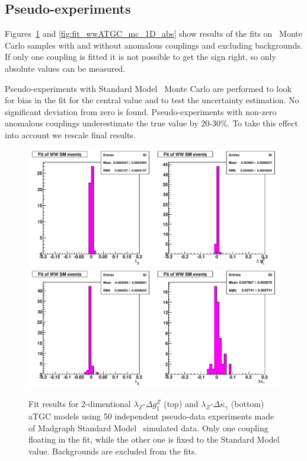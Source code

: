 \subsection{Pseudo-experiments}
Figures~\ref{fig:fit_ww_mc_1D} and \ref{fig:fit_wwATGC_mc_1D_abs} show
results of the fits on \ww\ Monte Carlo samples with and without
anomalous couplings and excluding backgrounds. If only one coupling is
fitted it is not possible to get the sign right, so only absolute
values can be measured.

Pseudo-experiments with Standard Model \ww\ Monte Carlo are performed to look
for bias in the fit for the central value and to test the uncertainty
estimation. No significant deviation from zero is
found. Pseudo-experiments with non-zero anomalous couplings underestimate 
the true value by 20-30\%. To take this effect into
account we rescale final results.

\begin{figure}[tp]
  \centering
    \includegraphics[width=1.0\textwidth]{figures/fit_ww_mc_1D}
    \includegraphics[width=1.0\textwidth]{figures/fit_ww_mc_1D_2}

  \caption[1D fits to WW SM Monte Carlo] {Fit results for
  2-dimentional $\lambda_{Z}$-$\Delta g^Z_1$ (top) and
  $\lambda_{Z}$-$\Delta\kappa_\gamma$ (bottom) aTGC models using 50
  independent pseudo-data experiments made of Madgraph Standard
  Model \ww\ simulated data. Only one coupling floating in the fit,
  while the other one is fixed to the Standard Model
  value. Backgrounds are excluded from the fits.}

\label{fig:fit_ww_mc_1D}
\end{figure}


